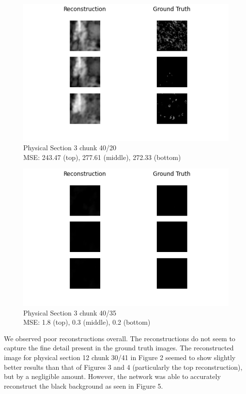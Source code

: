\documentclass[10pt,twocolumn,letterpaper]{article}
\begin{document}
\begin{figure}[!h]
	\centering
	\captionsetup{justification=centering}
		\hspace*{-1cm}	
		\includegraphics[scale=0.65]{../figures/3_40_20.png}
	\caption{Physical Section 3 chunk 40/20\\ MSE: 243.47 (top), 277.61 (middle), 272.33 (bottom)}		
\end{figure}

\vspace*{0.05cm}

\begin{figure}[!h]
	\centering
	\captionsetup{justification=centering}
		\hspace*{-1cm}	
		\includegraphics[scale=0.65]{../figures/10_40_35.png}
	\caption{Physical Section 3 chunk 40/35\\ MSE: 1.8 (top), 0.3 (middle), 0.2 (bottom)}		
\end{figure}

We observed poor reconstructions overall. The reconstructions do not seem to capture the fine detail present in the ground truth images. The reconstructed image for physical section 12 chunk 30/41 in Figure 2 seemed to show slightly better results than that of Figures 3 and 4 (particularly the top reconstruction), but by a negligible amount. However, the network was able to accurately reconstruct the black background as seen in Figure 5.
\end{document}
